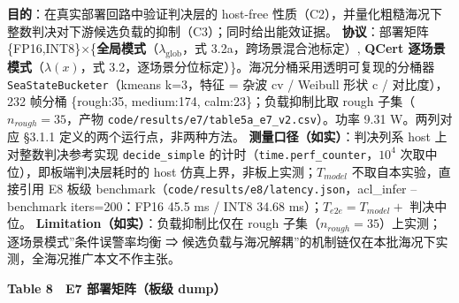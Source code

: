 \textbf{目的}：在真实部署回路中验证判决层的 host-free
性质（C2），并量化粗糙海况下整数判决对下游候选负载的抑制（C3）；同时给出能效证据。
\textbf{协议}：部署矩阵
\{FP16,INT8\}×\{\textbf{全局模式}（\(\lambda_{\mathrm{glob}}\)，式
3.2a，跨场景混合池标定）, \textbf{QCert 逐场景模式}（\(\lambda(x)\)，式
3.2，逐场景分位标定）\}。海况分桶采用透明可复现的分桶器
\texttt{SeaStateBucketer}（kmeans k=3，特征 = 杂波 cv / Weibull 形状 c /
对比度），232 帧分桶 \{rough:35, medium:174, calm:23\}；负载抑制比取
rough 子集（\(n_{rough}=35\)，产物
\texttt{code/results/e7/table5a\_e7\_v2.csv}）。功率 9.31 W。两列对应
§3.1.1 定义的两个运行点，非两种方法。
\textbf{测量口径（如实）}：判决列系 host 上对整数判决参考实现
\texttt{decide\_simple} 的计时（\texttt{time.perf\_counter}，\(10^4\)
次取中位），即板端判决层耗时的 host 仿真上界，非板上实测；\(T_{model}\)
不取自本实验，直接引用 E8 板级
benchmark（\texttt{code/results/e8/latency.json}，acl\_infer --benchmark
iters=200：FP16 45.5 ms / INT8 34.68 ms）；\(T_{e2e}=T_{model}+\)
判决中位。 \textbf{Limitation（如实）}：负载抑制比仅在 rough
子集（\(n_{rough}=35\)）上实测；逐场景模式''条件误警率均衡 ⇒
候选负载与海况解耦''的机制链仅在本批海况下实测，全海况推广本文不作主张。

\textbf{Table 8　E7 部署矩阵（板级 dump）}

